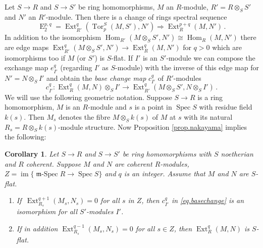 \documentclass[a4paper,10pt]{amsart}
\theoremstyle{plain}
\newtheorem{cor}[xx]{Corollary}%
\theoremstyle{definition}
\theoremstyle{remark}
\numberwithin{equation}{xx}
\DeclareMathOperator{\cE}{E}
\DeclareMathOperator{\Ext}{Ext}
\DeclareMathOperator{\Hom}{Hom}
\DeclareMathOperator{\im}{im}
\DeclareMathOperator{\mSpec}{\fr{m}-Spec}
\DeclareMathOperator{\Spec}{Spec}
\DeclareMathOperator{\Tor}{Tor}
\newcommand{\co}{\colon}
\newcommand{\ra}{\rightarrow}
\newcommand{\ot}{{\otimes}}
\newcommand{\Ra}{\Rightarrow}
\newcommand{\fr}[1]{\mathfrak{{#1}}}
\newcommand{\hm}[4]{{\Hom}_{#2}^{#1}({#3},{#4})}
\newcommand{\tor}[4]{{\Tor}_{#2}^{#1}({#3},{#4})}
\newcommand{\xt}[4]{{\Ext} _{#2}^{#1}({#3},{#4})}
\begin{document}
Let \(S\ra R\) and \(S\ra S'\) be ring homomorphisms, \(M\) an \(R\)-module, \(R'=R\ot_{S}S'\) and \(N'\) an \(R'\)-module. Then there is a change of rings spectral sequence 
\begin{equation}\label{eq.ss}
\cE_{2}^{p,q}=\xt{q}{R'}{\tor{S}{p}{M}{S'}}{N'}\Ra\xt{p+q}{R}{M}{N'}\,.
\end{equation} 
In addition to the isomorphism \(\hm{}{R'}{M\ot_{S}S'}{N'}\cong\hm{}{R}{M}{N'}\) there are edge maps \(\xt{q}{R'}{M\ot_{S}S'}{N'}\ra\xt{q}{R}{M}{N'}\) for \(q>0\) which are isomorphisms too if \(M\) (or \(S'\)) is \(S\)-flat. If \(I'\) is an \(S'\)-module we can compose the exchange map \(e^{q}_{I'}\) (regarding \(I'\) as \(S\)-module) with the inverse of this edge map for \(N'=N\ot_{S}I'\) and obtain the \emph{base change map} \(c^{q}_{I'}\) of \(R'\)-modules 
\begin{equation}\label{eq.basechange}
c^{q}_{I'}\co \xt{q}{R}{M}{N}\ot_{S}I'\ra\xt{q}{R'}{M\ot_{S}S'}{N\ot_{S}I'}\,.
\end{equation}
We will use the following geometric notation. Suppose \(S\ra R\) is a ring homomorphism, \(M\) is an \(R\)-module and \(s\) is a point in \(\Spec S\) with residue field \(k(s)\). Then \(M_{s}\) denotes the fibre \(M\ot_{S}k(s)\) of \(M\) at \(s\) with its natural \(R_{s}=R\ot_{S}k(s)\)-module structure. Now Proposition \ref{prop.nakayama} implies the following:
\begin{cor}\label{cor.xtdef}
Let \(S\ra R\) and \(S\ra S'\) be ring homomorphisms with \(S\) noetherian and \(R\) coherent\textup{.} Suppose \(M\) and \(N\) are coherent \(R\)-modules\textup{,} \(Z=\im\{\mSpec R\ra\Spec S\}\) and \(q\) is an integer\textup{.} Assume that \(M\) and \(N\) are \(S\)-flat\textup{.}
\begin{enumerate}
\item[(i)] If\, \(\xt{q+1}{R_{s}}{M_{s}}{N_{s}}=0\) for all \(s\) in \(Z\)\textup{,} then \(c^{q}_{I'}\) in \eqref{eq.basechange} is an isomorphism for all \(S'\)-modules \(I'\)\textup{.}
\item[(ii)] If in addition \(\xt{q-1}{R_{s}}{M_{s}}{N_{s}}=0\) for all \(s\in Z\)\textup{,} then \(\xt{q}{R}{M}{N}\) is \(S\)-flat\textup{.}
\end{enumerate}
\end{cor}
\end{document}
